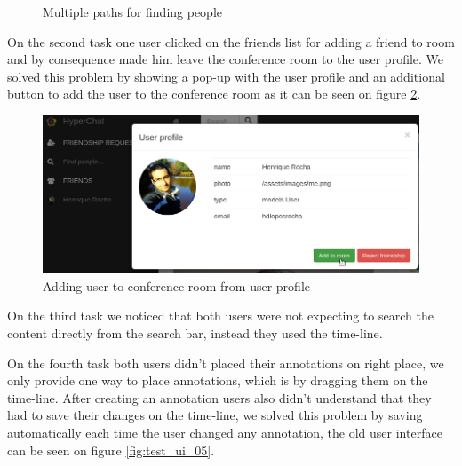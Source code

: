 \begin{figure}
    \caption{Multiple paths for finding people}
    \label{fig:test_ui_01_02_03}
\end{figure}

On the second task one user clicked on the friends list for adding a friend to room and by consequence made him leave the conference room to the user profile. We solved this problem by showing a pop-up with the user profile and an additional button to add the user to the conference room as it can be seen on figure \ref{fig:test_ui_04}.

\begin{figure}
\centering
\begin{minipage}[b]{0.7\linewidth}
\centering

    \includegraphics[width=\textwidth]{figures/test_ui_04.png}
\end{minipage}


    \caption{Adding user to conference room from user profile}
    \label{fig:test_ui_04}
\end{figure}

On the third task we noticed that both users were not expecting to search the content directly from the search bar, instead they used the time-line.

On the fourth task both users didn't placed their annotations on right place, we only provide one way to place annotations, which is by dragging them on the time-line. 
After creating an annotation users also didn't understand that they had to save their changes on the time-line, we solved this problem by saving automatically each time the user changed any annotation, the old user interface can be seen on figure \ref{fig:test_ui_05}.

